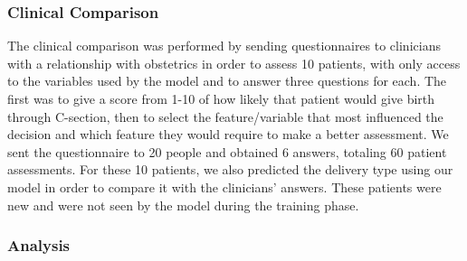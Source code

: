 \subsubsection{Clinical Comparison}
The clinical comparison was performed by sending questionnaires to clinicians with a relationship with obstetrics in order to assess 10 patients, with only access to the variables used by the model and to answer three questions for each. The first was to give a score from 1-10 of how likely that patient would give birth through C-section, then to select the feature/variable that most influenced the decision and which feature they would require to make a better assessment. We sent the questionnaire to 20 people and obtained 6 answers, totaling 60 patient assessments. For these 10 patients, we also predicted the delivery type using our model in order to compare it with the clinicians’ answers. These patients were new and were not seen by the model during the training phase.

\subsubsection{Analysis}


